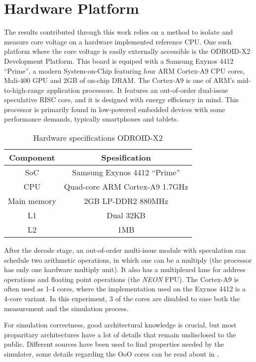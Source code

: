 \section{Hardware Platform}

The results contributed through this work relies on a method to isolate and
measure core voltage on a hardware implemented reference CPU. One such platform
where the core voltage is easily externally accessible is the ODROID-X2
Development Platform\cite{hardkernelodroidx2}. This board is equiped with a
Samsung Exynos 4412 ``Prime'', a modern System-on-Chip featuring four ARM
Cortex-A9 CPU cores, Mali-400 GPU and 2GB of on-chip DRAM. The Cortex-A9 is one
of ARM's mid-to-high-range application processors. It features an out-of-order
dual-issue speculative RISC core, and it is designed with energy efficiency in
mind. This processor is primarily found in low-powered embedded devices with
some performance demands, typically smartphones and tablets.

\begin{table}
\begin{tabular}{|c|c|}
\hline
Component   & Spesification\\
\hline
SoC         & Samsung Exynos 4412 ``Prime'' \\
CPU         & Quad-core ARM Cortex-A9 1.7GHz \\
Main memory & 2GB LP-DDR2 880MHz \\
L1          & Dual 32KB \\
L2          & 1MB \\
\hline
\end{tabular}
\caption{Hardware specifications ODROID-X2}
\label{tab:hwspecx2}
\end{table}

After the decode stage, an out-of-order multi-issue module with speculation can
schedule two arithmetic operations, in which one can be a multiply (the
processor has only one hardware multiply unit). It also has a multiplexed lane
for address operations and floating point operations (the \emph{NEON} FPU). The
Cortex-A9 is often used as 1-4 cores\cite{armsite}, where the implementation
used on the Exynos 4412 is a 4-core variant\cite{somesite}. In this experiment,
3 of the cores are disabled to ease both the measurement and the simulation
process.

For simulation correctness, good architectural knowledge is crucial, but most
proparitary architectures have a lot of details that remain undisclosed to the
public. Different sources have been used to find properties needed by the simulater,
some details regarding the OoO cores can be read about in \cite{blem2013detailed}.

